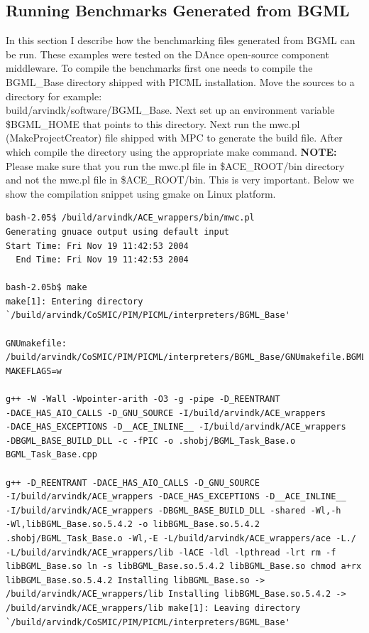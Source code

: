 \documentclass[onecolumn]{article}
\begin{document}
\subsection* {Running Benchmarks Generated from BGML}
In this section I describe how the benchmarking files generated from
BGML can be run. These examples were tested on the DAnce open-source
component middleware. To compile the benchmarks first one needs to
compile the BGML\_Base directory shipped with PICML installation. Move
the sources to a directory for example:
\\build/arvindk/software/BGML\_Base.  Next set up an environment
variable \$BGML\_HOME that points to this directory. Next run the mwc.pl
(MakeProjectCreator) file shipped with MPC to generate the build file.
After which compile the directory using the appropriate make command. 
{\bf NOTE:} Please make sure that you run the mwc.pl file in 
\$ACE\_ROOT/bin directory and not the mwc.pl file in \$ACE\_ROOT/bin.
This is very important.
Below
we show the compilation snippet using gmake on Linux platform.
{
\footnotesize
\begin{verbatim}
bash-2.05$ /build/arvindk/ACE_wrappers/bin/mwc.pl
Generating gnuace output using default input
Start Time: Fri Nov 19 11:42:53 2004
  End Time: Fri Nov 19 11:42:53 2004

bash-2.05b$ make
make[1]: Entering directory `/build/arvindk/CoSMIC/PIM/PICML/interpreters/BGML_Base'

GNUmakefile:
/build/arvindk/CoSMIC/PIM/PICML/interpreters/BGML_Base/GNUmakefile.BGML_Base
MAKEFLAGS=w

g++ -W -Wall -Wpointer-arith -O3 -g -pipe -D_REENTRANT
-DACE_HAS_AIO_CALLS -D_GNU_SOURCE -I/build/arvindk/ACE_wrappers
-DACE_HAS_EXCEPTIONS -D__ACE_INLINE__ -I/build/arvindk/ACE_wrappers
-DBGML_BASE_BUILD_DLL -c -fPIC -o .shobj/BGML_Task_Base.o
BGML_Task_Base.cpp

g++ -D_REENTRANT -DACE_HAS_AIO_CALLS -D_GNU_SOURCE
-I/build/arvindk/ACE_wrappers -DACE_HAS_EXCEPTIONS -D__ACE_INLINE__
-I/build/arvindk/ACE_wrappers -DBGML_BASE_BUILD_DLL -shared -Wl,-h
-Wl,libBGML_Base.so.5.4.2 -o libBGML_Base.so.5.4.2
.shobj/BGML_Task_Base.o -Wl,-E -L/build/arvindk/ACE_wrappers/ace -L./
-L/build/arvindk/ACE_wrappers/lib -lACE -ldl -lpthread -lrt rm -f
libBGML_Base.so ln -s libBGML_Base.so.5.4.2 libBGML_Base.so chmod a+rx
libBGML_Base.so.5.4.2 Installing libBGML_Base.so ->
/build/arvindk/ACE_wrappers/lib Installing libBGML_Base.so.5.4.2 ->
/build/arvindk/ACE_wrappers/lib make[1]: Leaving directory
`/build/arvindk/CoSMIC/PIM/PICML/interpreters/BGML_Base'
\end{verbatim}
}
\end{document}

